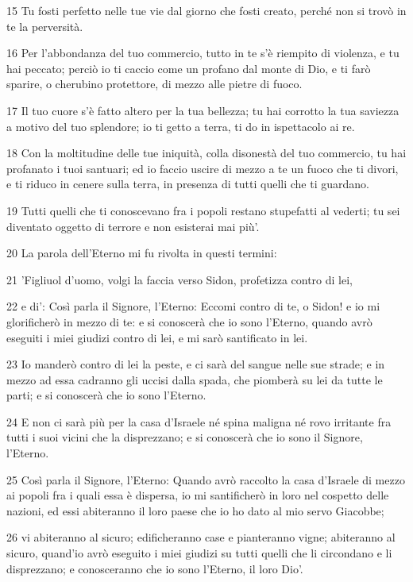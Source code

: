 \par 15 Tu fosti perfetto nelle tue vie dal giorno che fosti creato, perché non si trovò in te la perversità.
\par 16 Per l'abbondanza del tuo commercio, tutto in te s'è riempito di violenza, e tu hai peccato; perciò io ti caccio come un profano dal monte di Dio, e ti farò sparire, o cherubino protettore, di mezzo alle pietre di fuoco.
\par 17 Il tuo cuore s'è fatto altero per la tua bellezza; tu hai corrotto la tua saviezza a motivo del tuo splendore; io ti getto a terra, ti do in ispettacolo ai re.
\par 18 Con la moltitudine delle tue iniquità, colla disonestà del tuo commercio, tu hai profanato i tuoi santuari; ed io faccio uscire di mezzo a te un fuoco che ti divori, e ti riduco in cenere sulla terra, in presenza di tutti quelli che ti guardano.
\par 19 Tutti quelli che ti conoscevano fra i popoli restano stupefatti al vederti; tu sei diventato oggetto di terrore e non esisterai mai più'.
\par 20 La parola dell'Eterno mi fu rivolta in questi termini:
\par 21 'Figliuol d'uomo, volgi la faccia verso Sidon, profetizza contro di lei,
\par 22 e di': Così parla il Signore, l'Eterno: Eccomi contro di te, o Sidon! e io mi glorificherò in mezzo di te: e si conoscerà che io sono l'Eterno, quando avrò eseguiti i miei giudizi contro di lei, e mi sarò santificato in lei.
\par 23 Io manderò contro di lei la peste, e ci sarà del sangue nelle sue strade; e in mezzo ad essa cadranno gli uccisi dalla spada, che piomberà su lei da tutte le parti; e si conoscerà che io sono l'Eterno.
\par 24 E non ci sarà più per la casa d'Israele né spina maligna né rovo irritante fra tutti i suoi vicini che la disprezzano; e si conoscerà che io sono il Signore, l'Eterno.
\par 25 Così parla il Signore, l'Eterno: Quando avrò raccolto la casa d'Israele di mezzo ai popoli fra i quali essa è dispersa, io mi santificherò in loro nel cospetto delle nazioni, ed essi abiteranno il loro paese che io ho dato al mio servo Giacobbe;
\par 26 vi abiteranno al sicuro; edificheranno case e pianteranno vigne; abiteranno al sicuro, quand'io avrò eseguito i miei giudizi su tutti quelli che li circondano e li disprezzano; e conosceranno che io sono l'Eterno, il loro Dio'.

